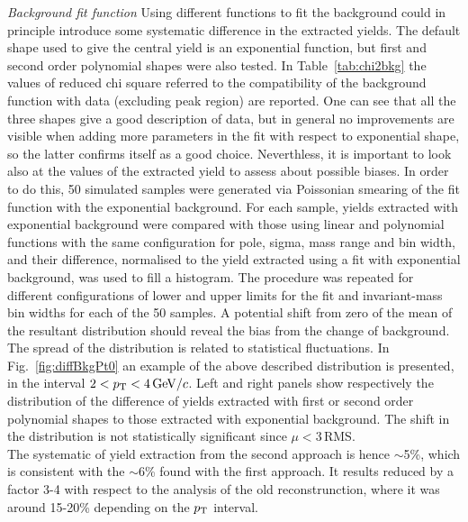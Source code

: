 \emph{Background fit function}
Using different functions to fit the background could in 
principle introduce some systematic difference in the extracted yields.
The default shape used to give the central yield is an 
exponential function, but first and second 
order polynomial shapes were also tested. In Table~\ref{tab:chi2bkg} 
the values of reduced chi square referred to the compatibility 
of the background function with data (excluding peak region) are 
reported. One can see that all the three shapes 
give a good description of data, but in general no improvements 
are visible when adding more parameters in the fit
with respect to exponential shape, so the latter confirms itself as a good choice.
Neverthless, it is important to look also at the values of the 
extracted yield to assess about possible biases.
 In order to do this, 50 simulated samples were generated via 
 Poissonian smearing of the fit function with the exponential background.
 For each sample, yields extracted with exponential 
 background were compared with those using linear and 
 polynomial functions with the same
configuration for pole, sigma, mass range and bin width, and their
difference, normalised to the yield extracted using a fit with exponential background, 
was used to fill a histogram. The procedure was repeated for different
configurations of lower and upper limits for the fit and 
invariant-mass bin widths for each of the
50 samples. 
A potential shift from zero of the mean of the resultant distribution 
 should reveal the bias from the change of background. The
  spread of the distribution is related to statistical fluctuations. 
  In Fig.~\ref{fig:diffBkgPt0} an example of the above 
  described distribution is presented, in the interval $2 < p_{\rm T} < 4\, \mathrm{GeV}/c$.
  Left and right panels show respectively the distribution of the difference
  of yields extracted with first or second order polynomial shapes to those extracted with exponential
  background. The shift in the distribution is not statistically significant 
 since $\mu < 3\,$RMS.\\
 
 
 
 
The systematic of yield extraction from the second approach is hence $\sim$5\%, which
is consistent with the $\sim 6$\% found with the first approach. 
It results reduced by a factor 3-4 with respect to the analysis of the old reconstrunction,
where it was around 15-20\% depending on the $p_{\rm T}$ interval. 

